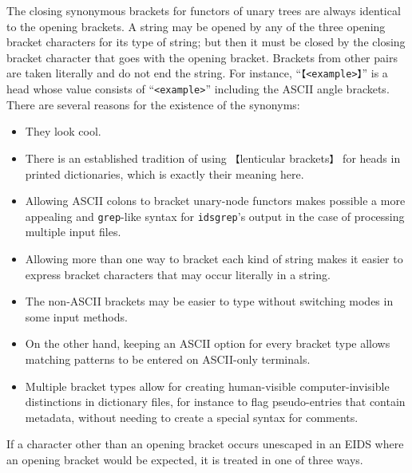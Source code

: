 \documentclass[twocolumn]{report}
\begin{document}
The closing synonymous brackets for functors of unary trees are always
identical to the opening brackets.  A string may be opened by any of the
three opening bracket characters for its type of string; but then it must be
closed by the closing bracket character that goes with the opening bracket. 
Brackets from other pairs are taken literally and do not end the string.
For instance,
``\texttt{【<example>】}'' is a head whose value consists of
``\texttt{<example>}'' including the ASCII angle brackets.  There are
several reasons for the existence of the synonyms:

\begin{itemize}
  \item They look cool.
  \item There is an established tradition of using \texttt{【}lenticular
    brackets\texttt{】} for heads in printed dictionaries, which is exactly
    their meaning here.
  \item Allowing ASCII colons to bracket unary-node functors makes possible
    a more appealing and \texttt{grep}-like syntax for \texttt{idsgrep}'s
    output in the case of processing multiple input files.
  \item Allowing more than one way to bracket each kind of string makes it
    easier to express bracket characters that may occur literally in a string.
  \item The non-ASCII brackets may be easier to type without switching modes
    in some input methods.
  \item On the other hand, keeping an ASCII option for every bracket type
    allows matching patterns to be entered on ASCII-only terminals.
  \item Multiple bracket types allow for creating human-visible
    computer-invisible distinctions in dictionary files, for instance to
    flag pseudo-entries that contain metadata, without needing to create a
    special syntax for comments.
\end{itemize}

If a character other than an opening bracket occurs unescaped
in an EIDS where an opening bracket would be expected, it is treated
in one of three ways.
\end{document}
